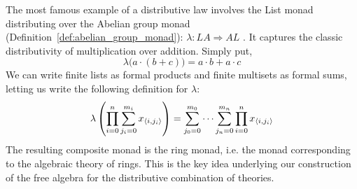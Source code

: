The most famous example of a distributive law involves the List monad distributing over the Abelian group monad (Definition~\ref{def:abelian_group_monad}): $\lambda : LA \Rightarrow AL$ \parencite{distributive_laws}. It captures the classic distributivity of multiplication over addition. Simply put, $$\lambda \bigl( a \cdot (b + c) \bigr) = a \cdot b + a \cdot c$$
We can write finite lists as formal products and finite multisets as formal sums, letting us write the following definition for $\lambda$:
$$\lambda \left( \prod_{i=0}^n\sum_{j_i = 0}^{m_i}x_{\left\langle i,j_i \right\rangle} \right) = \sum_{j_0=0}^{m_0}\cdots\sum_{j_n=0}^{m_n}\prod_{i=0}^{n}x_{\left\langle i, j_i\right\rangle}$$ The resulting composite monad is the ring monad, i.e. the monad corresponding to the algebraic theory of rings. This is the key idea underlying our construction of the free algebra for the distributive combination of theories.